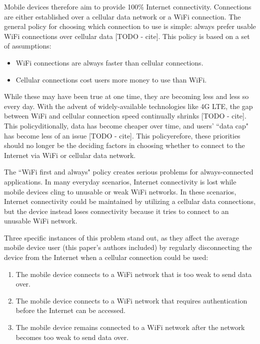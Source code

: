 Mobile devices therefore aim to provide 100\% Internet connectivity. Connections are either established over a cellular data network or a WiFi connection. The general policy for choosing which connection to use is simple: always prefer usable WiFi connections over cellular data [TODO - cite]. This policy is based on a set of assumptions:

\begin{itemize}
\item WiFi connections are always faster than cellular connections.
\item Cellular connections cost users more money to use than WiFi.
\end{itemize}

While these may have been true at one time, they are becoming less and less so every day. With the advent of widely-available technologies like 4G LTE, the gap between WiFi and cellular connection speed continually shrinks [TODO - cite]. This policyditionally, data has become cheaper over time, and users' ``data cap" has become less of an issue [TODO - cite]. This policyerefore, these priorities should no longer be the deciding factors in choosing whether to connect to the Internet via WiFi or cellular data network.

The ``WiFi first and always" policy creates serious problems for always-connected applications. In many everyday scenarios, Internet connectivity is lost while mobile devices cling to unusable or weak WiFi networks. In these scenarios, Internet connectivity could be maintained by utilizing a cellular data connections, but the device instead loses connectivity because it tries to connect to an unusable WiFi network.

Three specific instances of this problem stand out, as they affect the average mobile device user (this paper's authors included) by regularly disconnecting the device from the Internet when a cellular connection could be used:

\begin{enumerate}
\item The mobile device connects to a WiFi network that is too weak to send data over.
\item The mobile device connects to a WiFi network that requires authentication before the Internet can be accessed.
\item The mobile device remains connected to a WiFi network after the network becomes too weak to send data over.
\end{enumerate}

